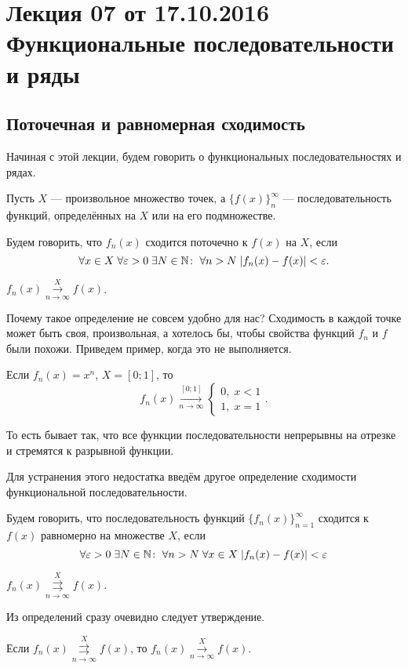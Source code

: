 \section{Лекция 07 от 17.10.2016 \\ Функциональные последовательности и ряды}
	\subsection{Поточечная и равномерная сходимость}
	Начиная с этой лекции, будем говорить о функциональных последовательностях и рядах.
	\par Пусть $X$ --- произвольное множество точек, а $\{f(x)\}_n^\infty$ --- последовательность функций, определённых на $X$ или на его подмножестве.
	\begin{Def}
		Будем говорить, что $f_n(x)$ сходится поточечно к $f(x)$ на $X$, если
		$$
		\forall x \in X\; \forall \varepsilon>0\; \exists N\in \mathbb{N}\colon \; \forall n>N\; |f_n(x) - f(x)| < \varepsilon.
		$$
	\end{Def}
	\begin{Designation}
	$f_n(x) \overset{X}{\underset{n\to\infty}{\longrightarrow}} f(x)$.
	\end{Designation}
	Почему такое определение не совсем удобно для нас? Сходимость в каждой точке может быть своя, произвольная, а хотелось бы, чтобы свойства функций $f_n$ и $f$ были похожи. Приведем пример, когда это не выполняется.
	\begin{Examples}
		Если $f_n(x) = x^n$, $X = [0;1]$, то
		$$
		f_n(x) \overset{[0;1]}{\underset{n\to\infty}{\longrightarrow}}		
		\begin{cases*}
			0,\;x<1\\
			1,\;x = 1
		\end{cases*}.
		$$
	\end{Examples}
	То есть бывает так, что все функции последовательности непрерывны на отрезке и стремятся к разрывной функции.
	\par Для устранения этого недостатка введём другое определение сходимости функциональной последовательности.
	\begin{Def}
		Будем говорить, что последовательность функций $\{f_n(x)\}_{n=1}^\infty$ сходится к $f(x)$ равномерно на множестве $X$, если 
		$$
		\forall \varepsilon > 0\; \exists N\in \mathbb{N}\colon \; \forall n>N\; \forall x \in X\; |f_n(x) - f(x)| < \varepsilon
		$$
	\end{Def}
	\begin{Designation}
		$f_n(x) \overset{X}{\underset{n\to\infty}{\rightrightarrows}} f(x)$.
	\end{Designation}
	Из определений сразу очевидно следует утверждение.
	\begin{Statement}
		Если $f_n(x)\overset{X}{\underset{n\to\infty}{\rightrightarrows}} f(x)$, то $f_n(x) \overset{X}{\underset{n\to\infty}{\longrightarrow}} f(x)$.
	\end{Statement}
	
